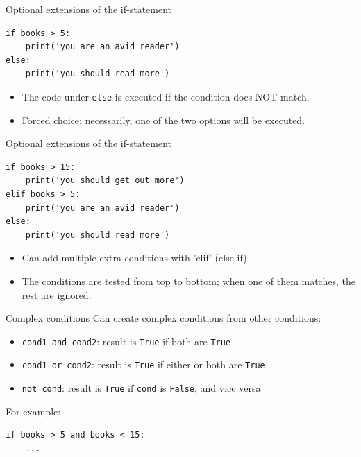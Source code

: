 \documentclass[aspectratio=169,usenames,dvipsnames]{beamer}
\begin{document}
\begin{frame}[fragile]{Optional extensions of the if-statement}
\begin{lstlisting}
if books > 5:
    print('you are an avid reader')
else:
    print('you should read more')
\end{lstlisting}

\begin{itemize}
    \item The code under \lstinline{else} is executed if the condition does NOT match.
    \item Forced choice: necessarily, one of the two options will be executed.
\end{itemize}
\end{frame}


\begin{frame}[fragile]{Optional extensions of the if-statement}
\begin{lstlisting}
if books > 15:
    print('you should get out more')
elif books > 5:
    print('you are an avid reader')
else:
    print('you should read more')
\end{lstlisting}

\begin{itemize}
    \item Can add multiple extra conditions with 'elif' (else if)
    \item The conditions are tested from top to bottom;
            when one of them matches, the rest are ignored.
\end{itemize}
\end{frame}


\begin{frame}[fragile]{Complex conditions}
    Can create complex conditions from other conditions:
    
    \begin{itemize}
        \item \lstinline{cond1 and cond2}:
            result is \lstinline{True} if both are \lstinline{True}
        \item \lstinline{cond1 or cond2}:
            result is \lstinline{True} if either or both are \lstinline{True}
        \item \lstinline{not cond}:
            result is \lstinline{True} if \lstinline{cond}
            is \lstinline{False}, and vice versa
    \end{itemize}

    \pause
    For example:
\begin{lstlisting}
if books > 5 and books < 15:
    ...
\end{lstlisting}

\end{frame}
\end{document}
